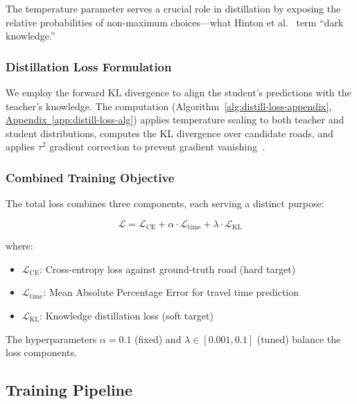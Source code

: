 The temperature parameter serves a crucial role in distillation by exposing the relative probabilities of non-maximum choices---what Hinton et al.~\cite{hintonDistillingKnowledgeNeural2015} term ``dark knowledge.''

\subsubsection{Distillation Loss Formulation}
\label{sec:method-kl}
We employ the forward KL divergence to align the student's predictions with the teacher's knowledge. The computation (Algorithm~\ref{alg:distill-loss-appendix}, \hyperref[app:distill-loss-alg]{Appendix~\ref*{app:distill-loss-alg}}) applies temperature scaling to both teacher and student distributions, computes the KL divergence over candidate roads, and applies $\tau^2$ gradient correction to prevent gradient vanishing~\cite{hintonDistillingKnowledgeNeural2015}.

\subsubsection{Combined Training Objective}
\label{sec:method-combined}
The total loss combines three components, each serving a distinct purpose:

\begin{equation}
\mathcal{L} = \mathcal{L}_{\text{CE}} + \alpha \cdot \mathcal{L}_{\text{time}} + \lambda \cdot \mathcal{L}_{\text{KL}}
\label{eq:total-loss}
\end{equation}

where:
\begin{itemize}[noitemsep,topsep=0pt]
\item $\mathcal{L}_{\text{CE}}$: Cross-entropy loss against ground-truth road (hard target)
\item $\mathcal{L}_{\text{time}}$: Mean Absolute Percentage Error for travel time prediction
\item $\mathcal{L}_{\text{KL}}$: Knowledge distillation loss (soft target)
\end{itemize}

The hyperparameters $\alpha = 0.1$ (fixed) and $\lambda \in [0.001, 0.1]$ (tuned) balance the loss components.

\subsection{Training Pipeline}
\label{sec:method-training}

